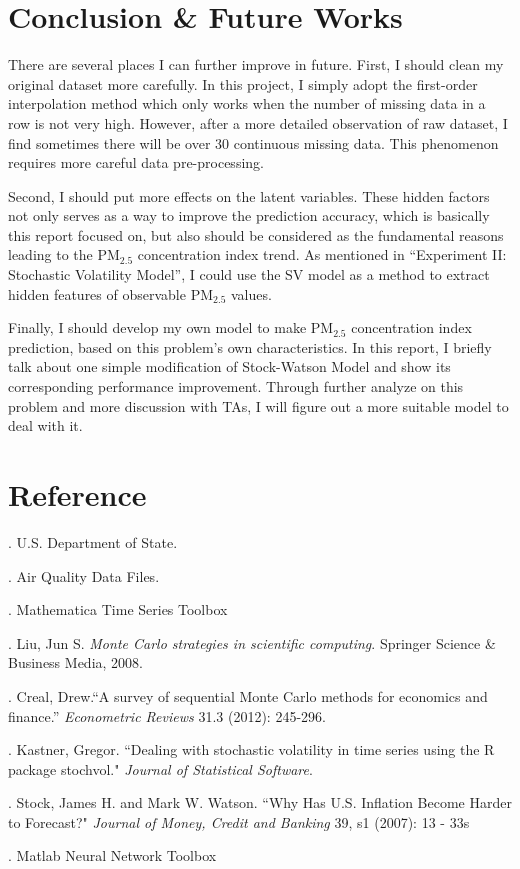 \documentclass[letterpaper]{article}
\begin{document}
\section{Conclusion \& Future Works }
There are several places I can further improve in future. First, I should clean my original dataset more carefully. In this project, I simply adopt the first-order interpolation method which only works when the number of missing data in a row is not very high. However, after a more detailed observation of raw dataset, I find sometimes there will be over 30 continuous missing data. This phenomenon requires more careful data pre-processing. 

Second, I should put more effects on the latent variables. These hidden factors not only serves as a way to improve the prediction accuracy, which is basically this report focused on, but also should be considered as the fundamental reasons leading to the $\text{PM}_{2.5}$ concentration index trend. As mentioned in ``Experiment II: Stochastic Volatility Model'', I could use the SV model as a method to extract hidden features of observable $\text{PM}_{2.5}$ values. 

Finally, I should develop my own model to make $\text{PM}_{2.5}$ concentration index prediction, based on this problem's own characteristics. In this report, I briefly talk about one simple modification of Stock-Watson Model and show its corresponding performance improvement. Through further analyze on this problem and more discussion with TAs, I will figure out a more suitable model to deal with it. 

\section{Reference}
\noindent [1]. U.S. Department of State.

\noindent [2]. Air Quality Data Files. 

\noindent [3]. Mathematica Time Series Toolbox

\noindent [4]. Liu, Jun S. \emph{Monte Carlo strategies in scientific computing}. Springer Science \& Business Media, 2008.

\noindent [5]. Creal, Drew.``A survey of sequential Monte Carlo methods for economics and finance.'' \emph{Econometric Reviews} 31.3 (2012): 245-296.

\noindent [6]. Kastner, Gregor. ``Dealing with stochastic volatility in time series using the R package stochvol." \emph{Journal of Statistical Software}.

\noindent [7]. Stock, James H. and Mark W. Watson. ``Why Has U.S. Inflation Become Harder to Forecast?" \emph{Journal of Money, Credit and Banking} 39, s1 (2007): 13 - 33s

\noindent [8]. Matlab Neural Network Toolbox
\end{document}
